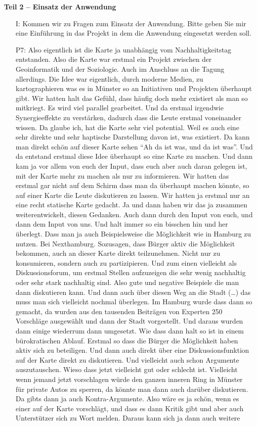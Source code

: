 \textbf{Teil 2 -- Einsatz der Anwendung}
\begin{itemize}
    \item[I:] Kommen wir zu Fragen zum Einsatz der Anwendung. Bitte geben Sie mir eine Einf{\"u}hrung in das Projekt in dem die Anwendung eingesetzt werden soll.
    \item[P7:] Also eigentlich ist die Karte ja unabh{\"a}ngig vom Nachhaltigkeitstag entstanden. Also die Karte war erstmal ein Projekt zwischen der Geoinformatik und der Soziologie. Auch im Anschluss an die Tagung allerdings. Die Idee war eigentlich, durch moderne Medien, zu kartographieren was es in M{\"u}nster so an Initiativen und Projekten {\"u}berhaupt gibt. Wir hatten halt das Gef{\"u}hl, dass h{\"a}ufig doch mehr existiert als man so mitkriegt. Es wird viel parallel gearbeitet. Und da erstmal irgendwie Synergieeffekte zu verst{\"a}rken, dadurch dass die Leute erstmal voneinander wissen. Da glaube ich, hat die Karte sehr viel potential. Weil es auch eine sehr direkte und sehr haptische Darstellung davon ist, was existiert. Da kann man direkt sch{\"o}n auf dieser Karte sehen "`Ah da ist was, und da ist was"'. Und da entstand erstmal diese Idee {\"u}berhaupt so eine Karte zu machen. Und dann kam ja vor allem von euch der Input, dass euch aber auch daran gelegen ist, mit der Karte mehr zu machen als nur zu informieren. Wir hatten das erstmal gar nicht auf dem Schirm dass man da {\"u}berhaupt machen k{\"o}nnte, so auf einer Karte die Leute diskutieren zu lassen. Wir hatten ja erstmal nur an eine recht statische Karte gedacht. Ja und dann haben wir das ja zusammen weiterentwickelt, diesen Gedanken. Auch dann durch den Input von euch, und dann dem Input von uns. Und halt immer so ein bisschen hin und her {\"u}berlegt. Dass man ja auch Beispielsweise die M{\"o}glichkeit wie in Hamburg zu nutzen. Bei Nexthamburg. Sozusagen, dass B{\"u}rger aktiv die M{\"o}glichkeit bekommen, auch an dieser Karte direkt teilzunehmen. Nicht nur zu konsumieren, sondern auch zu partizipieren. Und zum einen vielleicht als Diskussionsforum, um erstmal Stellen aufzuzeigen die sehr wenig nachhaltig oder sehr stark nachhaltig sind. Also gute und negative Beispiele die man dann diskutieren kann. Und dann auch {\"u}ber diesen Weg an die Stadt (\dots) das muss man sich vielleicht nochmal {\"u}berlegen. Im Hamburg wurde dass dann so gemacht, da wurden aus den tausenden Beitr{\"a}gen von Experten 250 Vorschl{\"a}ge ausgew{\"a}hlt und dann der Stadt vorgestellt. Und daraus wurden dann einige wiederrum dann umgesetzt. Wie dass dann halt so ist in einem b{\"u}rokratischen Ablauf. Erstmal so dass die B{\"u}rger die M{\"o}glichkeit haben aktiv sich zu beteiligen. Und dann auch direkt {\"u}ber eine Diskussionsfunktion auf der Karte direkt zu diskutieren. Und vielleicht auch schon Argumente auszutauschen. Wieso dass jetzt vielleicht gut oder schlecht ist. Vielleicht wenn jemand jetzt vorschlagen w{\"u}rde den ganzen inneren Ring in M{\"u}nster f{\"u}r private Autos zu sperren, da k{\"o}nnte man dann auch dar{\"u}ber diskutieren. Da gibts dann ja auch Kontra-Argumente. Also w{\"a}re es ja sch{\"o}n, wenn es einer auf der Karte vorschl{\"a}gt, und dass es dann Kritik gibt und aber auch Unterst{\"u}tzer sich zu Wort melden. Daraus kann sich ja dann auch weitere 
\end{itemize}
